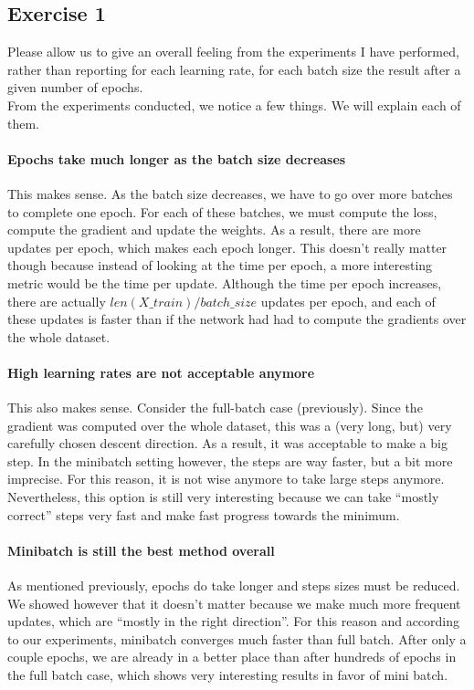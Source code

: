 \documentclass[12pt]{article}
\begin{document}
\subsection{Exercise 1}
Please allow us to give an overall feeling from the experiments I have performed, rather than reporting for each learning rate, for each batch size the result after a given number of epochs. \\
From the experiments conducted, we notice a few things. We will explain each of them.
\paragraph{Epochs take much longer as the batch size decreases}
This makes sense. As the batch size decreases, we have to go over more batches to complete one epoch. For each of these batches, we must compute the loss, compute the gradient and update the weights. As a result, there are more updates per epoch, which makes each epoch longer. This doesn't really matter though because instead of looking at the time per epoch, a more interesting metric would be the time per update. Although the time per epoch increases, there are actually $len(X\_train) / batch\_size$ updates per epoch, and each of these updates is faster than if the network had had to compute the gradients over the whole dataset.
\paragraph{High learning rates are not acceptable anymore}
This also makes sense. Consider the full-batch case (previously). Since the gradient was computed over the whole dataset, this was a (very long, but) very carefully chosen descent direction. As a result, it was acceptable to make a big step. In the minibatch setting however, the steps are way faster, but a bit more imprecise. For this reason, it is not wise anymore to take large steps anymore. Nevertheless, this option is still very interesting because we can take ``mostly correct'' steps very fast and make fast progress towards the minimum.
\paragraph{Minibatch is still the best method overall}
As mentioned previously, epochs do take longer and steps sizes must be reduced. We showed however that it doesn't matter because we make much more frequent updates, which are ``mostly in the right direction''. For this reason and according to our experiments, minibatch converges much faster than full batch. After only a couple epochs, we are already in a better place than after hundreds of epochs in the full batch case, which shows very interesting results in favor of mini batch.
\end{document}
